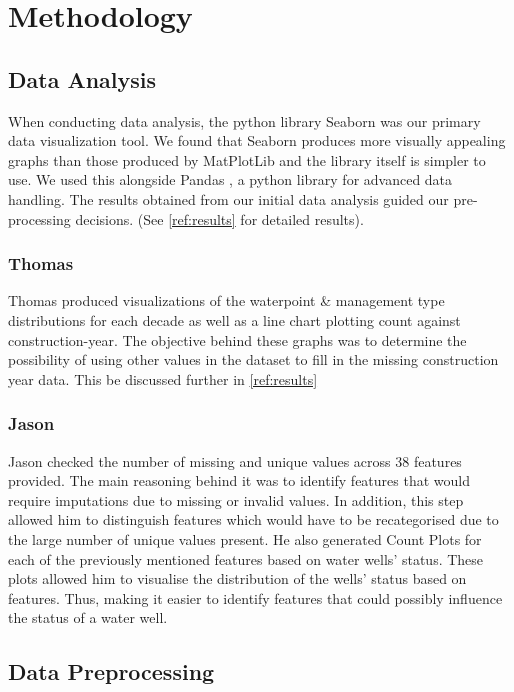 \documentclass[conference]{IEEEtran}
\begin{document}
\section{Methodology}

\subsection{Data Analysis}

When conducting data analysis, the python library Seaborn \cite{seaborn} was our primary data visualization tool. We found that Seaborn produces more visually appealing graphs than those produced by MatPlotLib and the library itself is simpler to use. We used this alongside Pandas \cite{pandas}, a python library for advanced data handling. The results obtained from our initial data analysis guided our pre-processing decisions. (See \ref{ref:results} for detailed results).

\subsubsection{Thomas}

Thomas produced visualizations of the waterpoint \& management type distributions for each decade as well as a line chart plotting count against construction-year. The objective behind these graphs was to determine the possibility of using other values in the dataset to fill in the missing construction year data. This be discussed further in \ref{ref:results}

\subsubsection{Jason}

Jason checked the number of missing and unique values across 38 features provided. The main reasoning behind it was to identify features that would require imputations due to missing or invalid values. In addition, this step allowed him to distinguish features which would have to be recategorised due to the large number of unique values present.  He also generated Count Plots for each of the previously mentioned features based on water wells' status. These plots allowed him to visualise the distribution of the wells' status based on features. Thus, making it easier to identify features that could possibly influence the status of a water well.

\subsection{Data Preprocessing}
\end{document}

